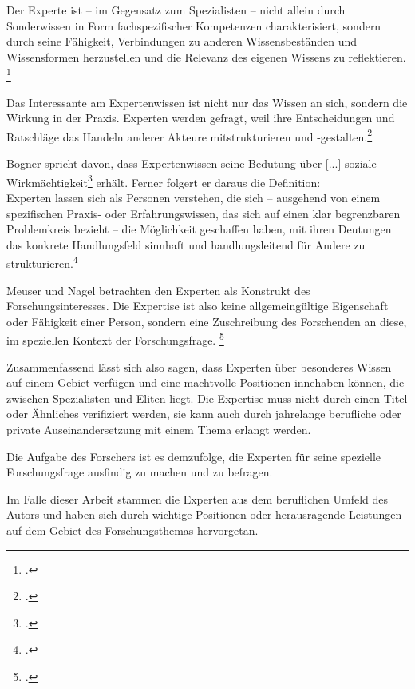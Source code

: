 \glqq{}Der Experte ist -- im Gegensatz zum Spezialisten – nicht allein durch Sonderwissen in Form fachspezifischer Kompetenzen charakterisiert, sondern durch seine Fähigkeit, Verbindungen zu anderen Wissensbeständen und Wissensformen herzustellen und die Relevanz des eigenen Wissens zu reflektieren\grqq.
\footcites[][14]{Bogner_2014_Interview}[Vgl.][21 \psq]{Hitzler_1994}

Das Interessante am Expertenwissen ist nicht nur das Wissen an sich, sondern die Wirkung in der Praxis. Experten werden gefragt, weil ihre Entscheidungen und Ratschläge das Handeln anderer Akteure mitstrukturieren und -gestalten.\footcite[Vgl.][13]{Bogner_2014_Interview}

Bogner spricht davon, dass Expertenwissen \glqq seine Bedutung über [...] soziale Wirkmächtigkeit\grqq{}\footcite[][13]{Bogner_2014_Interview} erhält.
Ferner folgert er daraus die Definition:\\ \glqq Experten lassen sich als Personen verstehen, die sich -- ausgehend von einem spezifischen Praxis- oder Erfahrungswissen, das sich auf einen klar begrenzbaren Problemkreis bezieht -- die Möglichkeit geschaffen haben, mit ihren Deutungen das konkrete Handlungsfeld sinnhaft und handlungsleitend für Andere zu strukturieren.\grqq{}\footcite[][13]{Bogner_2014_Interview}

Meuser und Nagel betrachten den Experten als Konstrukt des Forschungsinteresses. Die Expertise ist also keine allgemeingültige Eigenschaft oder Fähigkeit einer Person, sondern eine Zuschreibung des Forschenden an diese, im speziellen Kontext der Forschungsfrage. \footcite[Vgl.][181]{Meuser_1994_Interview}

Zusammenfassend lässt sich also sagen, dass Experten über besonderes Wissen auf einem Gebiet verfügen und eine machtvolle Positionen innehaben können, die zwischen Spezialisten und Eliten liegt. Die Expertise muss nicht durch einen Titel oder Ähnliches verifiziert werden, sie kann auch durch jahrelange berufliche oder private Auseinandersetzung mit einem Thema erlangt werden.

Die Aufgabe des Forschers ist es demzufolge, die Experten für seine spezielle Forschungsfrage ausfindig zu machen und zu befragen.

Im Falle dieser Arbeit stammen die Experten aus dem beruflichen Umfeld des Autors und haben sich durch wichtige Positionen oder herausragende Leistungen auf dem Gebiet des Forschungsthemas hervorgetan.



